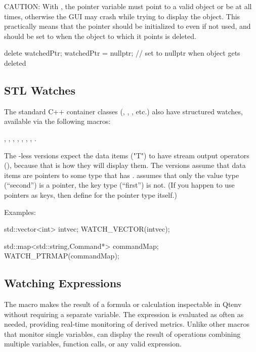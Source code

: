 CAUTION: With , the pointer variable must point to a valid
object or be  at all times, otherwise the GUI may crash
while trying to display the object. This practically means that
the pointer should be initialized to  even if not used, and
should be set to  when the object to which it points is deleted.

\begin{cpp}
delete watchedPtr;
watchedPtr = nullptr;  // set to nullptr when object gets deleted
\end{cpp}


\subsection{STL Watches}
\label{sec:sim-lib:stl-watches}

The standard C++ container classes (, , , etc.)
also have structured watches, available via the following macros:

, ,
, ,
, ,
, .

The -less versions expect the data items ("T") to have
stream output operators (), because that is how
they will display them. The  versions assume that
data items are pointers to some type that has .
 assumes that only the value type (``second'')
is a pointer, the key type (``first'') is not. (If you happen to use
pointers as keys, then define  for the pointer type
itself.)

Examples:

\begin{cpp}
std::vector<int> intvec;
WATCH_VECTOR(intvec);

std::map<std::string,Command*> commandMap;
WATCH_PTRMAP(commandMap);
\end{cpp}


\subsection{Watching Expressions}
\label{sec:sim-lib:expr-watches}

The  macro makes the result of a formula or calculation
inspectable in Qtenv without requiring a separate variable. The expression is
evaluated as often as needed, providing real-time monitoring of derived metrics.
Unlike other  macros that monitor single variables, 
can display the result of operations combining multiple variables, function
calls, or any valid expression.

